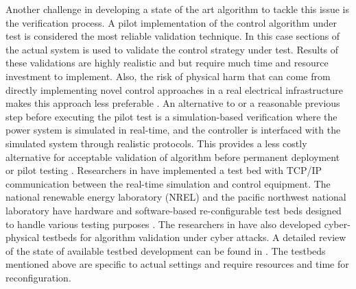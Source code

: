 Another challenge in developing a state of the art algorithm to tackle this issue is the verification process. A pilot implementation of the control algorithm under test is considered the most reliable validation technique. In this case sections of the actual system is used to validate the control strategy under test. Results of these validations are highly realistic and but require much time and resource investment to implement. Also, the risk of physical harm that can come from directly implementing novel control approaches in a real electrical infrastructure makes this approach less preferable \cite{TB_1}. An alternative to or a reasonable previous step before executing the pilot test is a simulation-based verification where the power system is simulated in real-time, and the controller is interfaced with the simulated system through realistic protocols. This provides a less costly alternative for acceptable validation of algorithm before permanent deployment or pilot testing \cite{TB_1}. Researchers in \cite{TB_2} have implemented a test bed with TCP/IP communication between the real-time simulation and control equipment. The national renewable energy laboratory (NREL) and the pacific northwest national laboratory have hardware and software-based re-configurable test beds designed to handle various testing purposes \cite{NREL_DER_TEST, VOLTRON}. The researchers in \cite{TB_3, TB_5} have also developed cyber-physical testbeds for algorithm validation under cyber attacks. A detailed review of the state of available testbed development can be found in \cite{TB_ALL}. The testbeds mentioned above are specific to actual settings and require resources and time for reconfiguration. 


